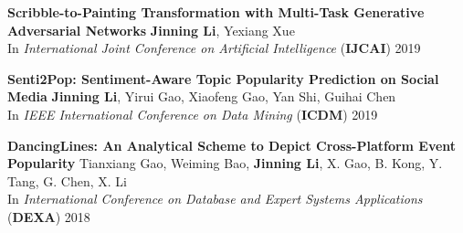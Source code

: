 \documentclass[12pt, letterpaper]{article}
\newcommand{\mhead}[1]{\leavevmode\marginpar{\sffamily\footnotesize #1}}
\begin{document}
{\textbf{Scribble-to-Painting Transformation with Multi-Task Generative Adversarial Networks}
\href{https://www.ijcai.org/proceedings/2019/820}{}\href{https://github.com/jinningli/DSP-Net}{}
\newline
\footnotesize
\textbf{Jinning Li}, Yexiang Xue\\
In \emph{International Joint Conference on Artificial Intelligence} (\textbf{IJCAI}) 2019
\small
\vspace{2pt}

\textbf{Senti2Pop: Sentiment-Aware Topic Popularity Prediction on Social Media}
\href{http://jinningli.cn/cv/Senti2Pop.pdf}{}
\newline
\footnotesize
\textbf{Jinning Li}, Yirui Gao, Xiaofeng Gao, Yan Shi, Guihai Chen\\
In \emph{IEEE International Conference on Data Mining} (\textbf{ICDM}) 2019
\small
\vspace{2pt}

\textbf{DancingLines: An Analytical Scheme to Depict Cross-Platform Event Popularity}
\href{http://jinningli.cn/cv/dancinglines.pdf}{}\href{https://github.com/jinningli/dancinglines}{}\newline
\footnotesize
Tianxiang Gao, Weiming Bao, \textbf{Jinning Li}, X. Gao, B. Kong, Y. Tang, G. Chen, X. Li\\
In \emph{International Conference on Database and Expert Systems Applications} (\textbf{DEXA}) 2018
\small
}

%
\end{document}
